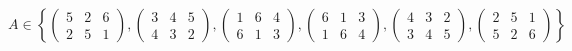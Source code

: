\documentclass[12pt]{article}
\begin{document}
\begin{enumerate}
    \[
    A \in \left\{
      \left(\begin{array}{ccc}
          5 & 2 & 6 \\
          2 & 5 & 1
      \end{array}\right),
      \left(\begin{array}{ccc}
          3 & 4 & 5 \\
          4 & 3 & 2
      \end{array}\right),
      \left(\begin{array}{ccc}
          1 & 6 & 4 \\
          6 & 1 & 3
      \end{array}\right),
      \left(\begin{array}{ccc}
          6 & 1 & 3 \\
          1 & 6 & 4
      \end{array}\right),
      \left(\begin{array}{ccc}
          4 & 3 & 2 \\
          3 & 4 & 5
      \end{array}\right),
      \left(\begin{array}{ccc}
          2 & 5 & 1 \\
          5 & 2 & 6
      \end{array}\right)
    \right\}
    \]


\end{enumerate}
\end{document}
